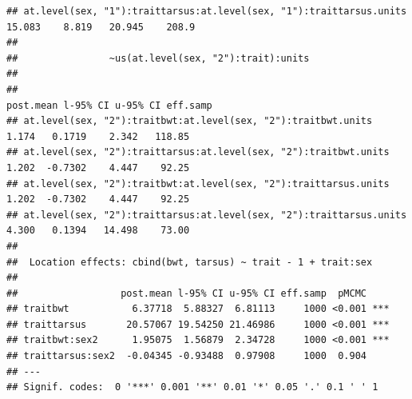 \documentclass[
  12pt,
]{book}
\newenvironment{Shaded}{\begin{snugshade}}{\end{snugshade}}
\newcommand{\FloatTok}[1]{\textcolor[rgb]{0.00,0.00,0.81}{#1}}
\newcommand{\FunctionTok}[1]{\textcolor[rgb]{0.00,0.00,0.00}{#1}}
\newcommand{\NormalTok}[1]{#1}
\newcommand{\SpecialCharTok}[1]{\textcolor[rgb]{0.00,0.00,0.00}{#1}}
\begin{document}
\begin{verbatim}
## at.level(sex, "1"):traittarsus:at.level(sex, "1"):traittarsus.units    15.083    8.819   20.945    208.9
## 
##                ~us(at.level(sex, "2"):trait):units
## 
##                                                                     post.mean l-95% CI u-95% CI eff.samp
## at.level(sex, "2"):traitbwt:at.level(sex, "2"):traitbwt.units           1.174   0.1719    2.342   118.85
## at.level(sex, "2"):traittarsus:at.level(sex, "2"):traitbwt.units        1.202  -0.7302    4.447    92.25
## at.level(sex, "2"):traitbwt:at.level(sex, "2"):traittarsus.units        1.202  -0.7302    4.447    92.25
## at.level(sex, "2"):traittarsus:at.level(sex, "2"):traittarsus.units     4.300   0.1394   14.498    73.00
## 
##  Location effects: cbind(bwt, tarsus) ~ trait - 1 + trait:sex 
## 
##                  post.mean l-95% CI u-95% CI eff.samp  pMCMC    
## traitbwt           6.37718  5.88327  6.81113     1000 <0.001 ***
## traittarsus       20.57067 19.54250 21.46986     1000 <0.001 ***
## traitbwt:sex2      1.95075  1.56879  2.34728     1000 <0.001 ***
## traittarsus:sex2  -0.04345 -0.93488  0.97908     1000  0.904    
## ---
## Signif. codes:  0 '***' 0.001 '**' 0.01 '*' 0.05 '.' 0.1 ' ' 1
\end{verbatim}

\begin{Shaded}
\end{Shaded}
\end{document}
